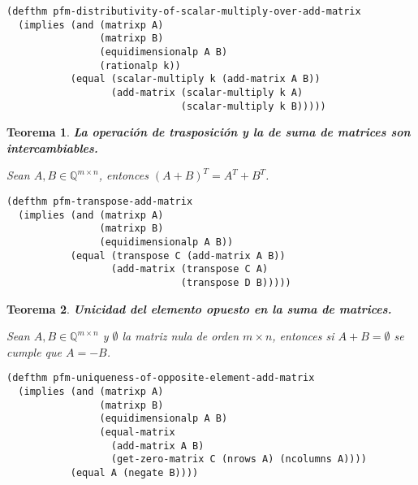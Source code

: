 \documentclass[a4paper,10pt]{article}
\newcommand{\M}[3]{#1 \in \mathbb{Q}^{#2 \times #3}}
\newtheorem{teor}{{Teorema}}
\begin{document}
\begin{lstlisting}[language=clips]
(defthm pfm-distributivity-of-scalar-multiply-over-add-matrix
  (implies (and (matrixp A)
                (matrixp B)
                (equidimensionalp A B)
                (rationalp k))
           (equal (scalar-multiply k (add-matrix A B))
                  (add-matrix (scalar-multiply k A) 
                              (scalar-multiply k B)))))
\end{lstlisting}	

\par \vspace{16pt}

\begin{teor} \textbf{La operación de trasposición y la de suma de matrices son intercambiables.}\vspace{8pt}\par
Sean $\M{A,B}{m}{n}$, entonces $(A + B)^T = A^T + B^T$.
\end{teor}

\begin{lstlisting}[language=clips]
(defthm pfm-transpose-add-matrix
  (implies (and (matrixp A)
                (matrixp B)
                (equidimensionalp A B))
           (equal (transpose C (add-matrix A B))
                  (add-matrix (transpose C A) 
                              (transpose D B)))))
\end{lstlisting}	

\par \vspace{16pt}

\begin{teor} \textbf{Unicidad del elemento opuesto en la suma de matrices.}\vspace{8pt}\par
Sean $\M{A,B}{m}{n}$ y $\emptyset$ la matriz nula de orden $m \times n$, entonces si $A + B = \emptyset$ se cumple que $A = -B$.
\end{teor}

\begin{lstlisting}[language=clips]
(defthm pfm-uniqueness-of-opposite-element-add-matrix
  (implies (and (matrixp A)
                (matrixp B)
                (equidimensionalp A B)
                (equal-matrix 
                  (add-matrix A B)
                  (get-zero-matrix C (nrows A) (ncolumns A))))
           (equal A (negate B))))
\end{lstlisting}	

\par \vspace{16pt}
\end{document}
